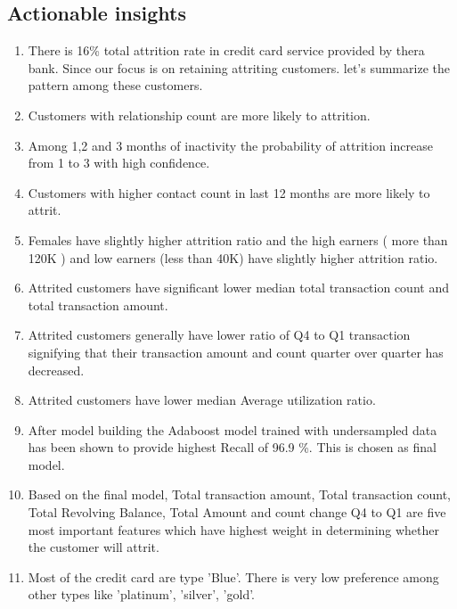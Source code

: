 \documentclass[10pt,a4paper]{style}
\begin{document}
\subsection{Actionable insights}
\begin{enumerate}
	\setlength\itemsep{-2pt}
	\item There is 16\% total attrition rate in credit card service provided by thera bank. Since our focus is on retaining attriting customers. let's summarize the pattern among these customers.
	\item Customers with relationship count are more likely to attrition.
	\item Among 1,2 and 3 months of inactivity the probability of attrition increase from 1 to 3 with high confidence.
	\item Customers with higher contact count in last 12 months are more likely to attrit. 
	\item Females have slightly higher attrition ratio and the high earners ( more than 120K ) and low earners (less than 40K) have slightly higher attrition ratio.
	\item Attrited customers have significant lower median total transaction count and total transaction amount.
	\item Attrited customers generally have lower ratio of Q4 to Q1 transaction signifying that their transaction amount and count quarter over quarter has decreased.
	\item Attrited customers have lower median Average utilization ratio.
	\item After model building the Adaboost model trained with undersampled data has been shown to provide highest Recall of 96.9 \%. This is chosen as final  model.  
	\item Based on the final model, Total transaction amount, Total transaction count, Total Revolving Balance, Total Amount and count change Q4 to Q1 are five most important features which have highest weight in determining whether the customer will attrit. 
	\item Most of the credit card are type 'Blue'. There is very low preference among other types like 'platinum', 'silver', 'gold'.
\end{enumerate}
\end{document}
